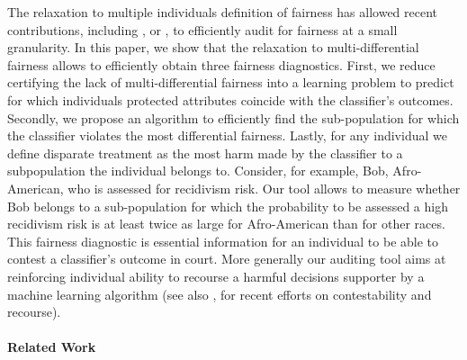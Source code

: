 \documentclass{article}
\begin{document}
 \bigskip
 The relaxation to multiple individuals definition of fairness has allowed recent contributions, including \cite{kim2018fairness}, \cite{hebert2017calibration} or \cite{kearns2017preventing}, to efficiently audit for fairness at a small granularity. In this paper,  we show that the relaxation to multi-differential fairness allows to efficiently obtain three fairness diagnostics.  First, we reduce certifying the lack of multi-differential fairness into a learning problem to predict for which individuals protected attributes coincide with the classifier's outcomes. Secondly, we propose an algorithm to efficiently find the sub-population for which the classifier violates the most differential fairness. Lastly, for any individual we define disparate treatment as the most harm made by the classifier to a subpopulation the individual belongs to. Consider, for example, Bob, Afro-American, who is assessed for recidivism risk. Our tool allows to measure whether Bob belongs to a sub-population for which the probability to be assessed a high recidivism risk is at least twice as large for Afro-American than for other races. This fairness diagnostic is essential information for an individual to be able to contest a classifier's outcome in court. More generally our auditing tool aims at reinforcing individual ability to recourse a harmful decisions supporter by a machine learning algorithm (see also \cite{ustun2018actionable}, \cite{russell2019efficient} for recent efforts on contestability and recourse).  
 
 \paragraph{Related Work}
 
 
\end{document}
